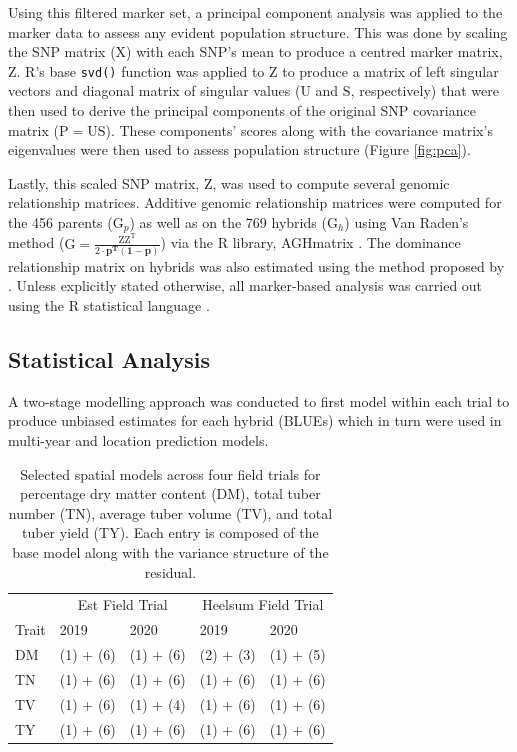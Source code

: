 Using this filtered marker set, a principal component analysis was applied to the marker data to assess any evident population structure. This was done by scaling the SNP matrix (\(\mathrm X\)) with each SNP's mean to produce a centred marker matrix, \(\mathrm Z\). R's base \texttt{svd()} function was applied to \(\mathrm Z\) to produce a matrix of left singular vectors and diagonal matrix of singular values (\(\mathrm U\) and \(\mathrm S\), respectively) that were then used to derive the principal components of the original SNP covariance matrix (\(\mathrm {P = US}\)). These components' scores along with the covariance matrix's eigenvalues were then used to assess population structure (Figure \ref{fig:pca}).

Lastly, this scaled SNP matrix, \(\mathrm Z\), was used to compute several genomic relationship matrices. Additive genomic relationship matrices were computed for the 456 parents (\(\mathrm G_p\)) as well as on the 769 hybrids (\(\mathrm G_h\)) using Van Raden's method (\(\mathrm{G = \frac{ZZ^T}{2\cdot \mathbf{p^T(1-p)}}}\)) \parencite{VanRaden2008} via the R library, AGHmatrix \parencite{Amadeu2016}. The dominance relationship matrix on hybrids was also estimated using the method proposed by \parencite{Su2012}. Unless explicitly stated otherwise, all marker-based analysis was carried out using the R statistical language \parencite{R2022}.

\subsection{Statistical Analysis}

A two-stage modelling approach was conducted to first model within each trial to produce unbiased estimates for each hybrid (BLUEs) which in turn were used in multi-year and location prediction models.

\begin{table}[H]
\caption{Selected spatial models across four field trials for percentage dry matter content (DM), total tuber number (TN), average tuber volume (TV), and total tuber yield (TY). Each entry is composed of the base model along with the variance structure of the residual.}
\label{tbl:spatial-model}
\centering
\begin{tabular}{lllll}
\toprule
\multicolumn{1}{c}{} & \multicolumn{2}{c}{Est Field Trial} & \multicolumn{2}{c}{Heelsum Field Trial} \\
\cmidrule(l{3pt}r{3pt}){2-3} \cmidrule(l{3pt}r{3pt}){4-5}
Trait & 2019 & 2020 & 2019 & 2020\\
\midrule
DM & (1) + (6) & (1) + (6) & (2) + (3) & (1) + (5)\\
TN & (1) + (6) & (1) + (6) & (1) + (6) & (1) + (6)\\
TV & (1) + (6) & (1) + (4) & (1) + (6) & (1) + (6)\\
TY & (1) + (6) & (1) + (6) & (1) + (6) & (1) + (6)\\
\bottomrule
\end{tabular}
\end{table}

